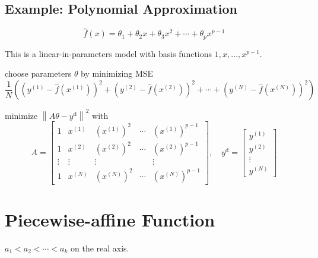 \subsection{Example: Polynomial Approximation}

\begin{problem}
    $$
\hat{f}(x)=\theta_{1}+\theta_{2} x+\theta_{3} x^{2}+\cdots+\theta_{p} x^{p-1}
$$
\end{problem}

This is a linear-in-parameters model with basis functions $ 1, x, \ldots, x^{p-1} $.

\begin{problem}
    choose parameters $ \theta $ by minimizing MSE
$$
\frac{1}{N}\left(\left(y^{(1)}-\hat{f}\left(x^{(1)}\right)\right)^{2}+\left(y^{(2)}-\hat{f}\left(x^{(2)}\right)\right)^{2}+\cdots+\left(y^{(N)}-\hat{f}\left(x^{(N)}\right)\right)^{2}\right)
$$
\end{problem}

\begin{problem} 
    minimize $ \left\|A \theta-y^{\mathrm{d}}\right\|^{2} $ with
    $$
    A=\left[\begin{array}{ccccc}
    1 & x^{(1)} & \left(x^{(1)}\right)^{2} & \cdots & \left(x^{(1)}\right)^{p-1} \\
    1 & x^{(2)} & \left(x^{(2)}\right)^{2} & \cdots & \left(x^{(2)}\right)^{p-1} \\
    \vdots & \vdots & \vdots & & \vdots \\
    1 & x^{(N)} & \left(x^{(N)}\right)^{2} & \cdots & \left(x^{(N)}\right)^{p-1}
    \end{array}\right], \quad y^{\mathrm{d}}=\left[\begin{array}{c}
    y^{(1)} \\
    y^{(2)} \\
    \vdots \\
    y^{(N)}
    \end{array}\right]
    $$
\end{problem}


\section{Piecewise-affine Function}

\begin{definition}
    $ a_{1}<a_{2}<\cdots<a_{k} $ on the real axis.
\end{definition}

